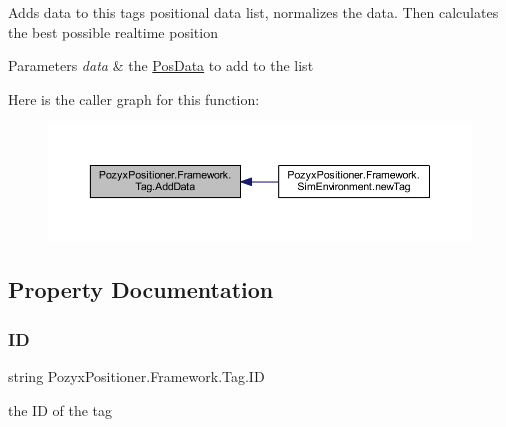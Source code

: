 Adds data to this tag\textquotesingle{}s positional data list, normalizes the data. Then calculates the best possible realtime position 


\begin{DoxyParams}{Parameters}
{\em data} & the \hyperlink{struct_pozyx_positioner_1_1_framework_1_1_pos_data}{Pos\+Data} to add to the list\\
\hline
\end{DoxyParams}
Here is the caller graph for this function\+:\nopagebreak
\begin{figure}[H]
\begin{center}
\leavevmode
\includegraphics[width=350pt]{class_pozyx_positioner_1_1_framework_1_1_tag_ac2741e137c420ad71f64ee2d3d5fefe8_icgraph}
\end{center}
\end{figure}


\subsection{Property Documentation}
\mbox{\label{class_pozyx_positioner_1_1_framework_1_1_tag_a0d75eeca4dea7088e2b4a60230c13012}} 
\subsubsection{\texorpdfstring{ID}{ID}}
{\footnotesize\ttfamily string Pozyx\+Positioner.\+Framework.\+Tag.\+ID\hspace{0.3cm}{\ttfamily [get]}}



the ID of the tag 

\mbox{\label{class_pozyx_positioner_1_1_framework_1_1_tag_a0b1b836b4e64ae70171587a2bcde4d71}} 
